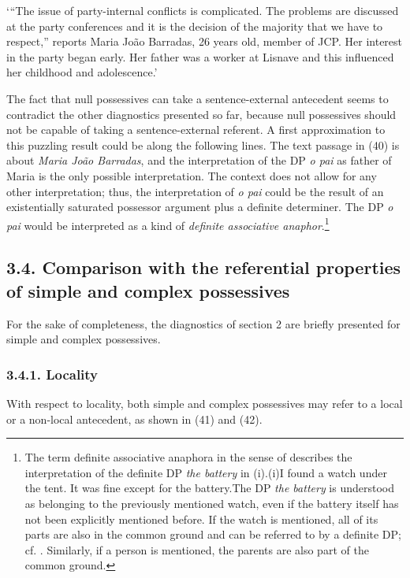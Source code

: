 \documentclass[output=paper]{langsci/langscibook}
\begin{document}
‘“The issue of party-internal conflicts is complicated. The problems are discussed at the party conferences and it is the decision of the majority that we have to respect,” reports Maria João Barradas, 26 years old, member of JCP. Her interest in the party began early. Her father was a worker at Lisnave and this influenced her childhood and adolescence.’

The fact that null possessives can take a sentence-external antecedent seems to contradict the other diagnostics presented so far, because null possessives should not be capable of taking a sentence-external referent. A first approximation to this puzzling result could be along the following lines. The text passage in (40) is about \textit{Maria João Barradas}, and the interpretation of the DP \textit{o pai} as father of Maria is the only possible interpretation. The context does not allow for any other interpretation; thus, the interpretation of \textit{o pai} could be the result of an existentially saturated possessor argument plus a definite determiner. The DP \textit{o pai} would be interpreted as a kind of \textit{definite associative anaphor}.\footnote{The term definite associative anaphora in the sense of \citet{Hawkins1978} describes the interpretation of the definite DP \textit{the battery} in (i).(i)I found a watch under the tent. It was fine except for the battery.The DP \textit{the battery} is understood as belonging to the previously mentioned watch, even if the battery itself has not been explicitly mentioned before. If the watch is mentioned, all of its parts are also in the common ground and can be referred to by a definite DP; cf. \citet{Heim1991}. Similarly, if a person is mentioned, the parents are also part of the common ground.}\textsuperscript{} 

\subsection{ 3.4. Comparison with the referential properties of simple and complex possessives}

For the sake of completeness, the diagnostics of section 2 are briefly presented for simple and complex possessives.

\subsubsection{ 3.4.1. Locality}

With respect to locality, both simple and complex possessives may refer to a local or a non-local antecedent, as shown in (41) and (42).
\end{document}

